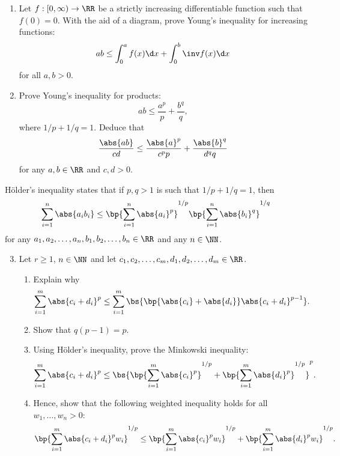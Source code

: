\begin{problem}[\chili]
    \begin{enumerate}
        \item Let $f : [0, \infty) \to \RR$ be a strictly increasing differentiable function such that $f(0) = 0$. With the aid of a diagram, prove Young's inequality for increasing functions: \[ab \leq \int_0^a f(x) \d x + \int_0^b \inv f(x) \d x\] for all $a, b > 0$.
        \item Prove Young's inequality for products: \[ab \leq \frac{a^p}{p} + \frac{b^q}{q},\] where $1/p + 1/q = 1$. Deduce that \[\frac{\abs{ab}}{cd} \leq \frac{\abs{a}^p}{c^p p} + \frac{\abs{b}^q}{d^q q}\] for any $a, b \in \RR$ and $c, d > 0$.
    \end{enumerate}

    H\"{o}lder's inequality states that if $p, q > 1$ is such that $1/p + 1/q = 1$, then \[\sum_{i = 1}^n \abs{a_i b_i} \leq \bp{\sum_{i = 1}^n \abs{a_i}^p}^{1/p} \bp{\sum_{i = 1}^n \abs{b_i}^q}^{1/q}\] for any $a_1, a_2, \dots, a_n, b_1, b_2, \dots, b_n \in \RR$ and any $n \in \NN$.

    \begin{enumerate}
        \setcounter{enumi}{2}
        \item Let $r \geq 1$, $n \in \NN$ and let $c_1, c_2, \dots, c_m, d_1, d_2, \dots, d_m \in \RR$.
        \begin{enumerate}
            \item Explain why \[\sum_{i = 1}^m \abs{c_i + d_i}^p \leq \sum_{i = 1}^m \bs{\bp{\abs{c_i} + \abs{d_i}} \abs{c_i + d_i}^{p-1}}.\]
            \item Show that $q(p-1) = p$.
            \item Using H\"{o}lder's inequality, prove the Minkowski inequality: \[\sum_{i = 1}^m \abs{c_i + d_i}^p \leq \bs{\bp{\sum_{i = 1}^m \abs{c_i}^p}^{1/p} + \bp{\sum_{i = 1}^m \abs{d_i}^p}^{1/p}}^p.\]
            \item Hence, show that the following weighted inequality holds for all $w_1, \dots, w_n > 0$: \[\bp{\sum_{i = 1}^m \abs{c_i + d_i}^p w_i}^{1/p} \leq \bp{\sum_{i = 1}^m \abs{c_i}^p w_i}^{1/p} + \bp{\sum_{i = 1}^m \abs{d_i}^p w_i}^{1/p}.\]
        \end{enumerate}
    \end{enumerate}
\end{problem}
